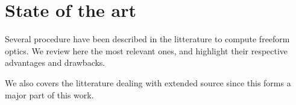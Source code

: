 \chapter{State of the art}
\label{ch:soa}

Several procedure have been described in the litterature to compute 
freeform optics. We review here the most relevant ones, and highlight
their respective advantages and drawbacks.

We also covers the litterature dealing with extended source since this 
forms a major part of this work.

